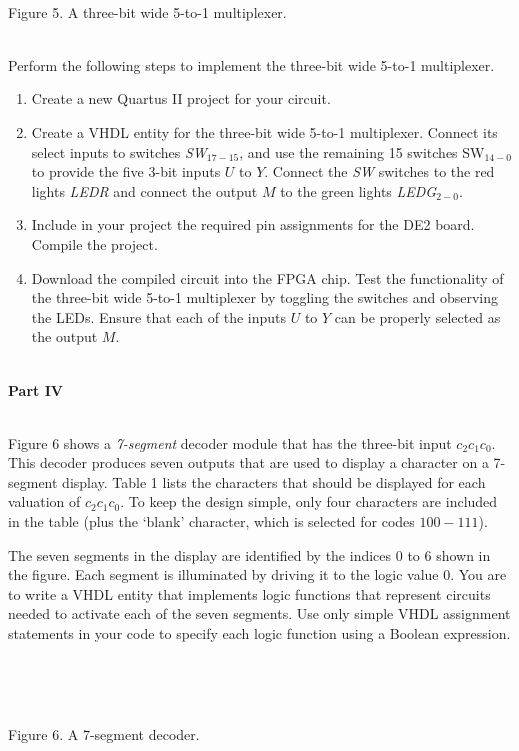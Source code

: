 \documentclass[psfig,10pt,fullpage]{article}
\begin{document}
\begin{figure}[H]
\scriptsize
\centerline{
\hbox{}}
\end{figure}
~\\
\centerline{Figure 5.  A three-bit wide 5-to-1 multiplexer.}
~\\

Perform the following steps to implement the three-bit wide 5-to-1 multiplexer.
\begin{enumerate}
\item Create a new Quartus II project for your circuit.
\item Create a VHDL entity for the three-bit wide 5-to-1 multiplexer. Connect its select
inputs to switches {\it SW}$_{17-15}$, and use the remaining 15 switches SW$_{14-0}$ to
provide the five 3-bit inputs $U$ to $Y$. Connect the {\it SW} switches
to the red lights {\it LEDR} and connect the output $M$ to the green lights {\it LEDG}$_{2-0}$.
\item Include in your project the required pin assignments for the DE2 board.
Compile the project.
\item Download the compiled circuit into the FPGA chip. Test the functionality of the 
three-bit wide 5-to-1 multiplexer by toggling the switches and observing the LEDs. Ensure
that each of the inputs $U$ to $Y$ can be properly selected as the output $M$.
\end{enumerate}

~\\
\noindent
{\bf Part IV}

~\\
\noindent
Figure 6 shows a {\it 7-segment} decoder module that has the three-bit input $c_2 c_1
c_0$. This decoder produces seven outputs that are used to display a character on a
7-segment display. Table 1 lists the characters that should be displayed for each
valuation of $c_2 c_1 c_0$. To keep the design simple, only four characters
are included in the table (plus the `blank' character, which is selected for codes
$100-111$).

The seven segments in the display are identified by the indices 0 to 6 shown in the
figure. Each segment is illuminated by driving it to the logic value 0. You are to write a
VHDL entity that implements logic functions that represent circuits needed to activate
each of the seven segments. Use only
simple VHDL assignment statements in your code to specify each logic function using a
Boolean expression. 

~\\
\begin{figure}[H]
\scriptsize
\centerline{
\hbox{}}
\end{figure}
~\\
\centerline{Figure 6.  A 7-segment decoder.}
~\\
\end{document}
